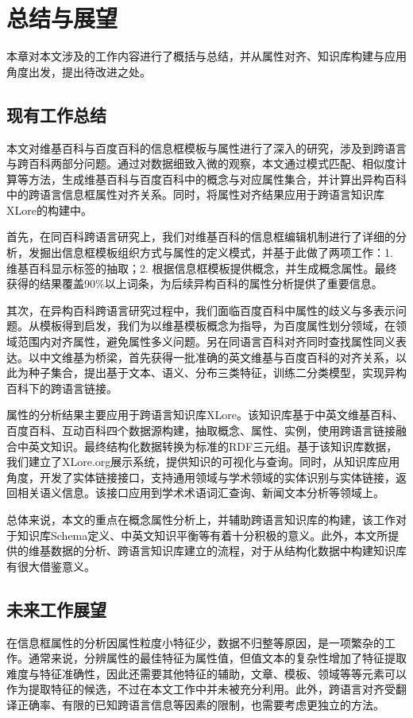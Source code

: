 \chapter{总结与展望}
\label{cha:conclusion}
本章对本文涉及的工作内容进行了概括与总结，并从属性对齐、知识库构建与应用角度出发，提出待改进之处。

\section{现有工作总结}
本文对维基百科与百度百科的信息框模板与属性进行了深入的研究，涉及到跨语言与跨百科两部分问题。通过对数据细致入微的观察，本文通过模式匹配、相似度计算等方法，生成维基百科与百度百科中的概念与对应属性集合，并计算出异构百科中的跨语言信息框属性对齐关系。同时，将属性对齐结果应用于跨语言知识库XLore的构建中。

首先，在同百科跨语言研究上，我们对维基百科的信息框编辑机制进行了详细的分析，发掘出信息框模板组织方式与属性的定义模式，并基于此做了两项工作：1. 维基百科显示标签的抽取；2. 根据信息框模板提供概念，并生成概念属性。最终获得的结果覆盖90\%以上词条，为后续异构百科的属性分析提供了重要信息。

其次，在异构百科跨语言研究过程中，我们面临百度百科中属性的歧义与多表示问题。从模板得到启发，我们为以维基模板概念为指导，为百度属性划分领域，在领域范围内对齐属性，避免属性多义问题。另在同语言百科对齐同时查找属性同义表达。以中文维基为桥梁，首先获得一批准确的英文维基与百度百科的对齐关系，以此为种子集合，提出基于文本、语义、分布三类特征，训练二分类模型，实现异构百科下的跨语言链接。

属性的分析结果主要应用于跨语言知识库XLore。该知识库基于中英文维基百科、百度百科、互动百科四个数据源构建，抽取概念、属性、实例，使用跨语言链接融合中英文知识。最终结构化数据转换为标准的RDF三元组。基于该知识库数据，我们建立了XLore.org展示系统，提供知识的可视化与查询。同时，从知识库应用角度，开发了实体链接接口，支持通用领域与学术领域的实体识别与实体链接，返回相关语义信息。该接口应用到学术术语词汇查询、新闻文本分析等领域上。

总体来说，本文的重点在概念属性分析上，并辅助跨语言知识库的构建，该工作对于知识库Schema定义、中英文知识平衡等有着十分积极的意义。此外，本文所提供的维基数据的分析、跨语言知识库建立的流程，对于从结构化数据中构建知识库有很大借鉴意义。

\section{未来工作展望}
在信息框属性的分析因属性粒度小特征少，数据不归整等原因，是一项繁杂的工作。通常来说，分辨属性的最佳特征为属性值，但值文本的复杂性增加了特征提取难度与特征准确性，因此还需要其他特征的辅助，文章、模板、领域等等元素可以作为提取特征的候选，不过在本文工作中并未被充分利用。此外，跨语言对齐受翻译正确率、有限的已知跨语言信息等因素的限制，也需要考虑更独立的方法。

